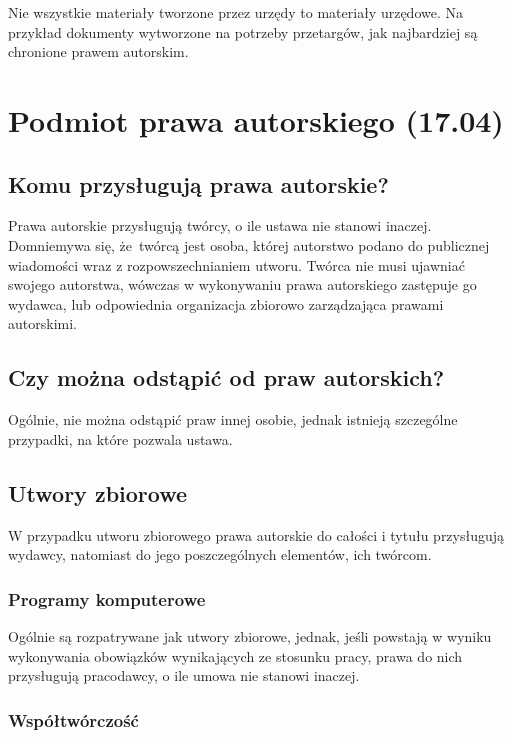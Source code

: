 \documentclass{article}
\begin{document}
Nie wszystkie materiały tworzone przez urzędy to materiały urzędowe.
Na przykład dokumenty wytworzone na potrzeby przetargów, jak najbardziej są chronione prawem autorskim.

\section{Podmiot prawa autorskiego (17.04)}

\subsection{Komu przysługują prawa autorskie?}

Prawa autorskie przysługują twórcy, o ile ustawa nie stanowi inaczej.
Domniemywa się, że~twórcą jest osoba, której autorstwo podano do publicznej wiadomości wraz z rozpowszechnianiem utworu.
Twórca nie musi ujawniać swojego autorstwa, wówczas w wykonywaniu prawa autorskiego zastępuje go wydawca, lub odpowiednia organizacja zbiorowo zarządzająca prawami autorskimi.

\subsection{Czy można odstąpić od praw autorskich?}

Ogólnie, nie można odstąpić praw innej osobie, jednak istnieją szczególne przypadki, na które pozwala ustawa.

\subsection{Utwory zbiorowe}

W przypadku utworu zbiorowego prawa autorskie do całości i tytułu przysługują wydawcy, natomiast do jego poszczególnych elementów, ich twórcom.

\subsubsection{Programy komputerowe}

Ogólnie są rozpatrywane jak utwory zbiorowe, jednak, jeśli powstają w wyniku wykonywania obowiązków wynikających ze stosunku pracy, prawa do nich przysługują pracodawcy, o ile umowa nie stanowi inaczej.

\subsubsection{Współtwórczość}
\end{document}
